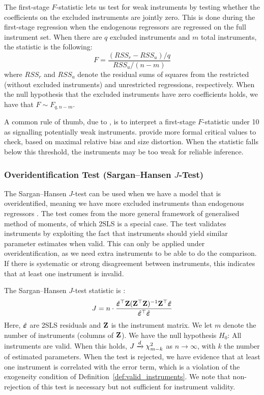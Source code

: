 The first-stage $F$-statistic lets us test for weak instruments by testing whether the coefficients on the excluded instruments are jointly zero. This is done during the first-stage regression when the endogenous regressors are regressed on the full instrument set. When there are $q$ excluded instruments and $m$ total instruments, the statistic is the following:
\begin{equation}
\label{eq:first_stage_f}
    F = \frac{(RSS_r - RSS_u)/q}{RSS_u/(n - m)}
\end{equation}
where $RSS_r$ and $RSS_u$ denote the residual sums of squares from the restricted (without excluded instruments) and unrestricted regressions, respectively. When the null hypothesis that the excluded instruments have zero coefficients holds, we have that $F \sim F_{q, n-m}$.

A common rule of thumb, due to \textcite[p.~557]{Staiger1997}, is to interpret a first-stage $F$-statistic under 10 as signalling potentially weak instruments. \textcite[Table~1]{StockYogo2005} provide more formal critical values to check, based on maximal relative bias and size distortion. When the statistic falls below this threshold, the instruments may be too weak for reliable inference.

\subsubsection{Overidentification Test (Sargan--Hansen $J$-Test)}

The Sargan--Hansen $J$-test can be used when we have a model that is overidentified, meaning we have more excluded instruments than endogenous regressors \parencite{Sargan1958, Hansen1982}. The test comes from the more general framework of generalised method of moments, of which 2SLS is a special case. The test validates instruments by exploiting the fact that instruments should yield similar parameter estimates when valid. This can only be applied under overidentification, as we need extra instruments to be able to do the comparison. If there is systematic or strong disagreement between instruments, this indicates that at least one instrument is invalid.

The Sargan--Hansen $J$-test statistic is \parencite[Sec.~4.2.2, pp.~141--146]{Angrist2009}:
\begin{equation}
\label{eq:sargan_hansen}
    J = n \cdot \frac{\hat{\bm{\varepsilon}}^\top\mathbf{Z}(\mathbf{Z}^\top\mathbf{Z})^{-1}\mathbf{Z}^\top\hat{\bm{\varepsilon}}}{\hat{\bm{\varepsilon}}^\top\hat{\bm{\varepsilon}}}
\end{equation}
Here, $\hat{\bm{\varepsilon}}$ are 2SLS residuals and $\mathbf{Z}$ is the instrument matrix. We let $m$ denote the number of instruments (columns of $\mathbf{Z}$). We have the null hypothesis $H_0$: All instruments are valid. When this holds, $J \xrightarrow{d} \chi^2_{m-k}$ as $n \to \infty$, with $k$ the number of estimated parameters. When the test is rejected, we have evidence that at least one instrument is correlated with the error term, which is a violation of the exogeneity condition of Definition~\ref{def:valid_instruments}. We note that non-rejection of this test is necessary but not sufficient for instrument validity.

